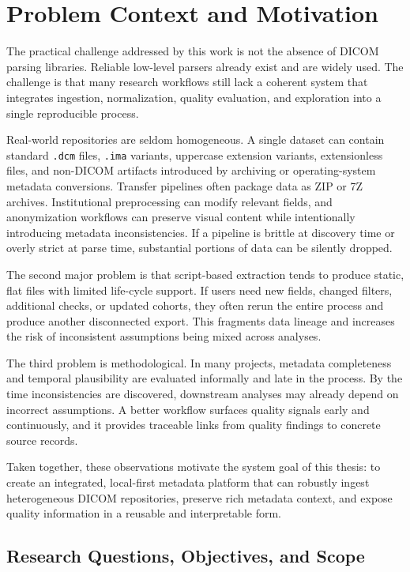 \chapter{Problem Context and Motivation}
The practical challenge addressed by this work is not the absence of DICOM parsing libraries. Reliable low-level parsers already exist and are widely used. The challenge is that many research workflows still lack a coherent system that integrates ingestion, normalization, quality evaluation, and exploration into a single reproducible process.

Real-world repositories are seldom homogeneous. A single dataset can contain standard \texttt{.dcm} files, \texttt{.ima} variants, uppercase extension variants, extensionless files, and non-DICOM artifacts introduced by archiving or operating-system metadata conversions. Transfer pipelines often package data as ZIP or 7Z archives. Institutional preprocessing can modify relevant fields, and anonymization workflows can preserve visual content while intentionally introducing metadata inconsistencies. If a pipeline is brittle at discovery time or overly strict at parse time, substantial portions of data can be silently dropped.

The second major problem is that script-based extraction tends to produce static, flat files with limited life-cycle support. If users need new fields, changed filters, additional checks, or updated cohorts, they often rerun the entire process and produce another disconnected export. This fragments data lineage and increases the risk of inconsistent assumptions being mixed across analyses. 

The third problem is methodological. In many projects, metadata completeness and temporal plausibility are evaluated informally and late in the process. By the time inconsistencies are discovered, downstream analyses may already depend on incorrect assumptions. A better workflow surfaces quality signals early and continuously, and it provides traceable links from quality findings to concrete source records.

Taken together, these observations motivate the system goal of this thesis: to create an integrated, local-first metadata platform that can robustly ingest heterogeneous DICOM repositories, preserve rich metadata context, and expose quality information in a reusable and interpretable form.

\section{Research Questions, Objectives, and Scope}

